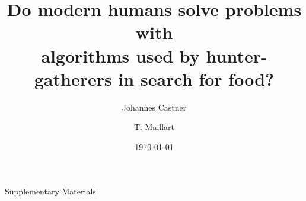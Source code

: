 \documentclass[12pt]{revtex4}
\begin{document}
\title{Do modern humans solve problems with \\ algorithms used by hunter-gatherers in search for food?}


\author{Johannes Castner}

\author{T. Maillart}


\date{\today}


\begin{abstract}

\end{abstract}

\maketitle


%





\clearpage





\clearpage


\clearpage
%

\renewcommand\thesection{S\arabic{section}}
\setcounter{section}{0}

\renewcommand\theequation{S\arabic{equation}}
\setcounter{equation}{0}


\begin{center}
{\Large Supplementary Materials}
\vspace{3cm}
\end{center}





\end{document}
